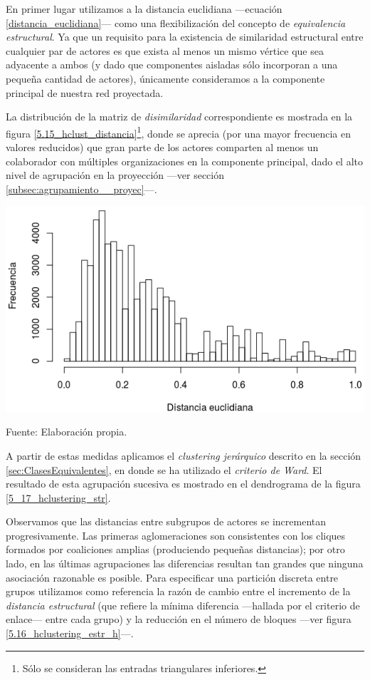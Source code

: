 \documentclass[letterpaper, 11pt]{book}
\theoremstyle{definition}
\theoremstyle{remark}
\begin{document}
En primer lugar utilizamos a la distancia euclidiana ---ecuación \ref{distancia_euclidiana}--- como una flexibilización del concepto de \emph{equivalencia estructural}. 
Ya que un requisito para la existencia de similaridad estructural entre cualquier par de actores es que exista al menos un mismo vértice que sea adyacente a ambos (y dado que componentes aisladas sólo incorporan a una pequeña cantidad de actores), únicamente consideramos a la componente principal de nuestra red proyectada. 


La distribución de la matriz de \emph{disimilaridad} correspondiente es mostrada en la figura \ref{5.15_hclust_distancia}\footnote{
    Sólo se consideran las entradas triangulares inferiores. 
}, donde se aprecia (por una mayor frecuencia en valores reducidos) que gran parte de los actores comparten al menos un colaborador con múltiples organizaciones en la componente principal, dado el alto nivel de agrupación en la proyección ---ver sección \ref{subsec:agrupamiento__proyec}---. 


\begin{minipage}{\linewidth}
\centering
{} \label{5.15_hclust_distancia}
\includegraphics[scale=0.58]{img/5.15_hclust_distancia.png}
\par\bigskip
\small Fuente: Elaboración propia. 
\end{minipage}\bigskip


A partir de estas medidas aplicamos el \emph{clustering jerárquico} descrito en la sección \ref{sec:ClasesEquivalentes}, en donde se ha utilizado el \emph{criterio de Ward}. 
El resultado de esta agrupación sucesiva es mostrado en el dendrograma de la figura \ref{5_17_hclustering_str}.


Observamos que las distancias entre subgrupos de actores se incrementan progresivamente. 
Las primeras aglomeraciones son consistentes con los cliques formados por coaliciones amplias (produciendo pequeñas distancias); por otro lado, en las últimas agrupaciones las diferencias resultan tan grandes que ninguna asociación razonable es posible. 
Para especificar una partición discreta entre grupos utilizamos como referencia la razón de cambio entre el incremento de la \emph{distancia estructural} (que refiere la mínima diferencia ---hallada por el criterio de enlace--- entre cada grupo) y la reducción en el número de bloques ---ver figura \ref{5.16_hclustering_estr_h}---. 
\end{document}
